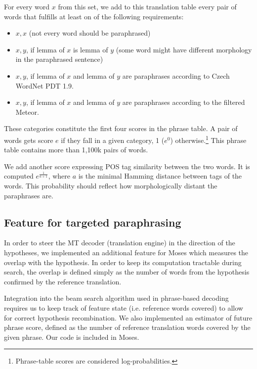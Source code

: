 \begin{itemize}
For every word $ x $ from this set, we add to this translation table every pair of 
words that fulfills at least on of the following requirements:

\begin{itemize}
\item $ x,x $ (not every word should be paraphrased)
\item $ x,y $, if lemma of $ x $ is lemma of $ y $ (some word 
might have different morphology in the paraphrased sentence)
\item $ x,y $, if lemma of $ x $ and lemma of $ y $ are paraphrases according 
to Czech WordNet PDT 1.9.
\item $ x,y $, if lemma of $ x $ and lemma of $ y $ are paraphrases according 
to the filtered Meteor.
\end{itemize}

These categories constitute the first four scores in the phrase table. A pair of 
words gets score $ e $ if they fall in a given category, 1
($e^0$) otherwise.\footnote{Phrase-table scores are considered log-probabilities.} 
This phrase table contains more than 1,100k pairs of words.

We add another score expressing POS tag similarity between the two words. It is computed 
$ e^{\frac{1}{a+1}}$, where $ a $ is the minimal Hamming distance between tags of the
words. This probability should reflect how morphologically distant the paraphrases are. 
\end{itemize}

\subsection{Feature for targeted paraphrasing}
In order to steer the MT decoder (translation engine) in the direction of the
hypotheses, we implemented an additional feature for Moses which
measures the overlap with the hypothesis. In order to keep its computation
tractable during search, the overlap is defined simply as the number of words
from the hypothesis confirmed by the reference translation.

Integration into the beam search algorithm used in phrase-based decoding
requires us to keep track of feature state (i.e. reference words covered) to
allow for correct hypothesis recombination. We also implemented an estimator of
future phrase score, defined as the number of reference translation words
covered by the given phrase. Our code is included in
Moses.

